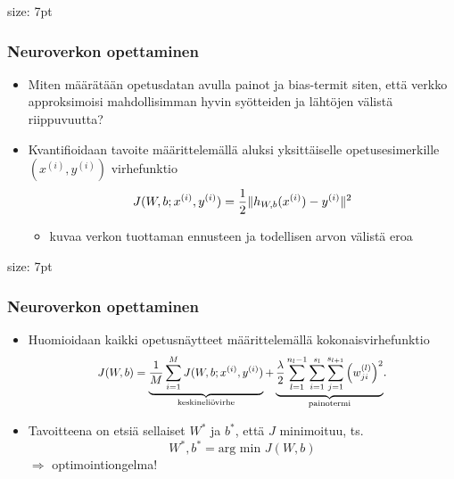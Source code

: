 \documentclass{beamer} %
\DeclarePairedDelimiter\norm{\lVert}{\rVert}%
\theoremstyle{definition}
\begin{document}
 

\begin{frame}{}{size: 7pt}\frametitle{Neuroverkon opettaminen}
\begin{itemize}
    \item Miten määrätään opetusdatan avulla painot ja bias-termit siten, että verkko approksimoisi mahdollisimman hyvin syötteiden ja lähtöjen välistä riippuvuutta?
    
    \item Kvantifioidaan tavoite määrittelemällä aluksi yksittäiselle opetusesimerkille \((x^{(i)}, y^{(i)})\) virhefunktio
    \[\displaystyle J(W, b; x^{(i)}, y^{(i)})= \frac{1}{2}\norm{h_{W, b}(x^{(i)})-y^{(i)}}^2\]
    \begin{itemize}
        \item kuvaa verkon tuottaman ennusteen ja todellisen arvon välistä eroa
    \end{itemize}
\end{itemize}
\end{frame}

\begin{frame}{}{size: 7pt}\frametitle{Neuroverkon opettaminen}
\begin{itemize}
    \item Huomioidaan kaikki opetusnäytteet määrittelemällä kokonaisvirhefunktio
    \[ \scalebox{.9}{$\displaystyle J(W, b)=\underbrace{\frac{1}{M}\sum_{i=1}^{M} J(W, b; x^{(i)}, y^{(i)})}_{\text{keskineliövirhe}}+\underbrace{\frac{\lambda}{2}\sum_{l=1}^{n_l-1}\sum_{i=1}^{s_l}\sum_{j=1}^{s_{l+1}} \left(w_{ji}^{(l)}\right)^2}_{\text{painotermi}}$}.\]

    \item Tavoitteena on etsiä sellaiset \(W^*\) ja \(b^*\), että \(J\) minimoituu, ts. \[W^*, b^*=\text{arg min } J(W, b)\]
    \(\Rightarrow\) \alert{optimointiongelma}!
\end{itemize}
\end{frame}
\end{document}
